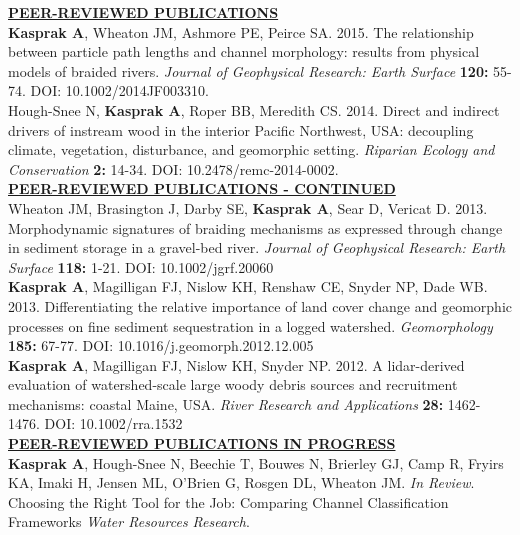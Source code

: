 \documentclass{article}
\begin{document}
\noindent \textbf{\underline{PEER-REVIEWED PUBLICATIONS}}\\
\noindent \textbf{Kasprak A}, Wheaton JM, Ashmore PE, Peirce SA. 2015. The relationship between particle path lengths and channel morphology: results from physical models of braided rivers. \textit{Journal of Geophysical Research: Earth Surface} \textbf{120:} 55-74. DOI: 10.1002/2014JF003310.\\

\noindent Hough-Snee N, \textbf{Kasprak A}, Roper BB, Meredith CS. 2014. Direct and indirect drivers of instream wood in the interior Pacific Northwest, USA: decoupling climate, vegetation, disturbance, and geomorphic setting. \textit{Riparian Ecology and Conservation} \textbf{2:} 14-34. DOI: 10.2478/remc-2014-0002.\\

\newpage
\noindent \textbf{\underline{PEER-REVIEWED PUBLICATIONS - CONTINUED}}\\
\noindent Wheaton JM, Brasington J, Darby SE, \textbf{Kasprak A}, Sear D, Vericat D. 2013. Morphodynamic signatures of braiding mechanisms as expressed through change in sediment storage in a gravel-bed river. \textit{Journal of Geophysical Research: Earth Surface} \textbf{118:} 1-21. DOI: 10.1002/jgrf.20060\\ 

\noindent \textbf{Kasprak A}, Magilligan FJ, Nislow KH, Renshaw CE, Snyder NP, Dade WB. 2013. Differentiating the relative importance of land cover change and geomorphic processes on fine sediment sequestration in a logged watershed. \textit{Geomorphology} \textbf{185:} 67-77. DOI: 10.1016/j.geomorph.2012.12.005\\

\noindent \textbf{Kasprak A}, Magilligan FJ, Nislow KH, Snyder NP. 2012. A lidar-derived evaluation of watershed-scale large woody debris sources and recruitment mechanisms: coastal Maine, USA. \textit{River Research and Applications} \textbf{28:} 1462-1476. DOI: 10.1002/rra.1532\\

\noindent \textbf{\underline{PEER-REVIEWED PUBLICATIONS IN PROGRESS}}\\
\noindent \textbf{Kasprak A}, Hough-Snee N, Beechie T, Bouwes N, Brierley GJ, Camp R, Fryirs KA, Imaki H, Jensen ML, O'Brien G, Rosgen DL, Wheaton JM. \textit{In Review}. Choosing the Right Tool for the Job: Comparing Channel Classification Frameworks \textit{Water Resources Research}.\\
\end{document}
